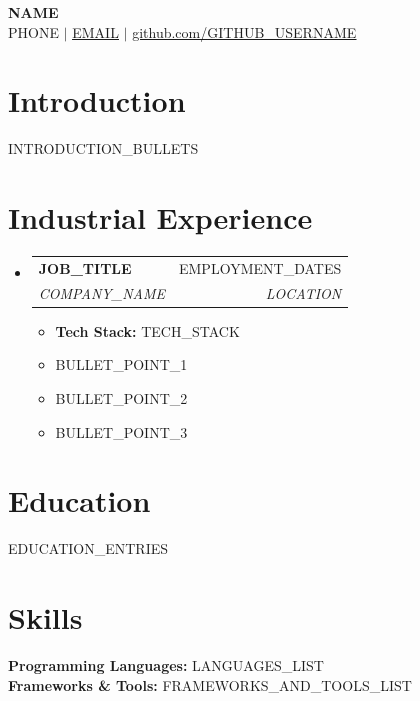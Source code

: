 \documentclass[letterpaper,10pt]{article}
\makeatletter
\newcommand{\resumeItem}[1]{
  \item\small{
    {#1 \vspace{-2pt}}
  }
}
\newcommand{\resumeSubheading}[4]{
  \vspace{-2pt}\item
    \begin{tabular*}{0.97\textwidth}[t]{l@{\extracolsep{\fill}}r}
      \textbf{#1} & #2 \\
      \textit{\small#3} & \textit{\small #4} \\
    \end{tabular*}\vspace{-7pt}
}
\newcommand{\resumeSubHeadingListStart}{\begin{itemize}[leftmargin=0.15in, label={}]}
\newcommand{\resumeSubHeadingListEnd}{\end{itemize}}
\newcommand{\resumeItemListStart}{\begin{itemize}}
\newcommand{\resumeItemListEnd}{\end{itemize}\vspace{-5pt}}
\makeatother
\begin{document}
\begin{center}
    \textbf{\Huge \scshape {{NAME}}} \\ \vspace{8pt}
    \small {{PHONE}} $|$ \href{mailto:{{EMAIL}}}{\underline{{{EMAIL}}}} $|$ 
    \href{https://github.com/{{GITHUB_USERNAME}}}{\underline{github.com/{{GITHUB_USERNAME}}}}
\end{center}

\section{Introduction}
\begin{itemize}[leftmargin=0.15in, label={}]
    \small{\item{
        {{INTRODUCTION_BULLETS}}
    }}
\end{itemize}

\section{Industrial Experience}
  \resumeSubHeadingListStart

    \resumeSubheading
      {{{JOB_TITLE}}}{{{EMPLOYMENT_DATES}}}
      {{{COMPANY_NAME}}}{{{LOCATION}}}
      \resumeItemListStart
        \resumeItem{\textbf{Tech Stack:} {{{TECH_STACK}}}}
        \resumeItem{{{{BULLET_POINT_1}}}}
        \resumeItem{{{{BULLET_POINT_2}}}}
        \resumeItem{{{{BULLET_POINT_3}}}}
      \resumeItemListEnd

  \resumeSubHeadingListEnd

\section{Education}
  \resumeSubHeadingListStart
{{EDUCATION_ENTRIES}}
  \resumeSubHeadingListEnd

\section{Skills}
 \begin{itemize}[leftmargin=0.15in, label={}]
    \small{\item{
     \textbf{Programming Languages:} {{{LANGUAGES_LIST}}} \\ \vspace{3pt}
     \textbf{Frameworks \& Tools:} {{{FRAMEWORKS_AND_TOOLS_LIST}}}
    }}
 \end{itemize}
\end{document}
